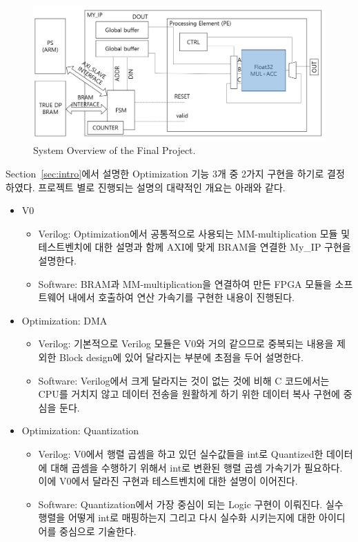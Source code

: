 \documentclass{article}
\begin{document}
\begin{figure}[htb!]
	\centering
	\includegraphics[width=1\textwidth]{fig/overview.png}
\caption{System Overview of the Final Project.}
\label{fig2}
\end{figure}

\newpage
Section~\ref{sec:intro}에서 설명한 Optimization 기능 3개 중 2가지 구현을 하기로 결정하였다. 프로젝트 별로 진행되는 설명의 대략적인 개요는 아래와 같다.

\begin{itemize}
    \item V0
        \begin{itemize}
            \item Verilog: Optimization에서 공통적으로 사용되는 MM-multiplication 모듈 및 테스트벤치에 대한 설명과 함께 AXI에 맞게 BRAM을 연결한 My\_IP 구현을 설명한다.
            \item Software: BRAM과 MM-multiplication을 연결하여 만든 FPGA 모듈을 소프트웨어 내에서 호출하여 연산 가속기를 구현한 내용이 진행된다.
        \end{itemize}
    \item Optimization: DMA
        \begin{itemize}
            \item Verilog: 기본적으로 Verilog 모듈은 V0와 거의 같으므로 중복되는 내용을 제외한 Block design에 있어 달라지는 부분에 초점을 두어 설명한다. 
            \item Software: Verilog에서 크게 달라지는 것이 없는 것에 비해 C 코드에서는 CPU를 거치지 않고 데이터 전송을 원활하게 하기 위한 데이터 복사 구현에 중심을 둔다.
        \end{itemize}
    \item Optimization: Quantization
        \begin{itemize}
            \item Verilog: V0에서 행렬 곱셈을 하고 있던 실수값들을 int로 Quantized한 데이터에 대해 곱셈을 수행하기 위해서 int로 변환된 행렬 곱셈 가속기가 필요하다. 이에 V0에서 달라진 구현과 테스트벤치에 대한 설명이 이어진다.
            \item Software: Quantization에서 가장 중심이 되는 Logic 구현이 이뤄진다. 실수 행렬을 어떻게 int로 매핑하는지 그리고 다시 실수화 시키는지에 대한 아이디어를 중심으로 기술한다.
        \end{itemize}
\end{itemize}
\end{document}

